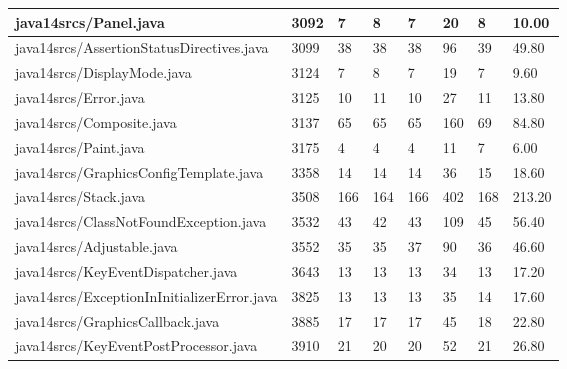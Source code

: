 \begin{tabular}{|l|l|l|l|l|l|l|l|}
\hline
java14srcs/Panel.java                              & 3092        & 7         & 8         & 7         & 20        & 8         & 10.00     \\
\hline
java14srcs/AssertionStatusDirectives.java          & 3099        & 38        & 38        & 38        & 96        & 39        & 49.80     \\
\hline
java14srcs/DisplayMode.java                        & 3124        & 7         & 8         & 7         & 19        & 7         & 9.60      \\
\hline
java14srcs/Error.java                              & 3125        & 10        & 11        & 10        & 27        & 11        & 13.80     \\
\hline
java14srcs/Composite.java                          & 3137        & 65        & 65        & 65        & 160       & 69        & 84.80     \\
\hline
java14srcs/Paint.java                              & 3175        & 4         & 4         & 4         & 11        & 7         & 6.00      \\
\hline
java14srcs/GraphicsConfigTemplate.java             & 3358        & 14        & 14        & 14        & 36        & 15        & 18.60     \\
\hline
java14srcs/Stack.java                              & 3508        & 166       & 164       & 166       & 402       & 168       & 213.20    \\
\hline
java14srcs/ClassNotFoundException.java             & 3532        & 43        & 42        & 43        & 109       & 45        & 56.40     \\
\hline
java14srcs/Adjustable.java                         & 3552        & 35        & 35        & 37        & 90        & 36        & 46.60     \\
\hline
java14srcs/KeyEventDispatcher.java                 & 3643        & 13        & 13        & 13        & 34        & 13        & 17.20     \\
\hline
java14srcs/ExceptionInInitializerError.java        & 3825        & 13        & 13        & 13        & 35        & 14        & 17.60     \\
\hline
java14srcs/GraphicsCallback.java                   & 3885        & 17        & 17        & 17        & 45        & 18        & 22.80     \\
\hline
java14srcs/KeyEventPostProcessor.java              & 3910        & 21        & 20        & 20        & 52        & 21        & 26.80     \\

\end{tabular}
